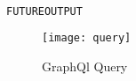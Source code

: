 \begin{lstlisting}[language=Python, label={lst:graphql-output-json}]
FUTUREOUTPUT
\end{lstlisting} 

\begin{figure}[htp]
\centering
\texttt{[image: query]}
\caption{GraphQl Query}
\label{fig:GraphQlQuery}
\end{figure}
